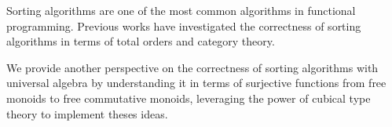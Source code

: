 Sorting algorithms are one of the most common algorithms in functional programming.
Previous works have investigated the correctness of sorting algorithms in terms of
total orders and category theory. 

We provide another perspective on the correctness of sorting algorithms with
universal algebra by understanding it in terms of surjective functions from
free monoids to free commutative monoids, leveraging the power of cubical
type theory to implement theses ideas.